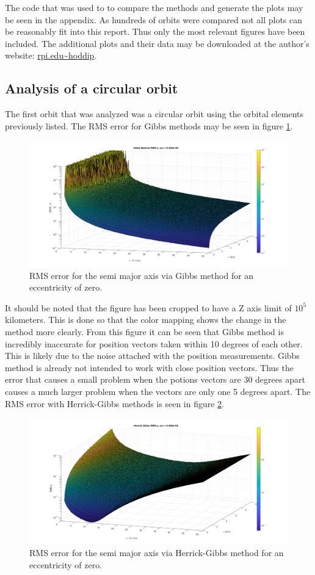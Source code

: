 \documentclass[12pt]{article}
\begin{document}
	The code that was used to to compare the methods and generate the plots may be seen in the appendix. As hundreds of orbits were compared not all plots can be reasonably fit into this report. Thus only the most relevant figures have been included. The additional plots and their data may be downloaded at the author's website: \url{rpi.edu\~hoddip}.
	\subsection{Analysis of a circular orbit}
	The first orbit that was analyzed was a circular orbit using the orbital elements previously listed. The RMS error for Gibbs methods may be seen in figure \ref{fig:circulargibbs}.
	\begin{figure}
		\centering
		\includegraphics[width=0.7\linewidth]{circularGibbs}
		\caption{RMS error for the semi major axis via Gibbs method for an eccentricity of zero.}
		\label{fig:circulargibbs}
	\end{figure}
		It should be noted that the figure has been cropped to have a Z axis limit of $10^5$ kilometers. This is done so that the color mapping shows the change in the method more clearly. From this figure it can be seen that Gibbs method is incredibly inaccurate for position vectors taken within 10 degrees of each other. This is likely due to the noise attached with the position measurements. Gibbs method is already not intended to work with close position vectors. Thus the error that causes a small problem when the potions vectors are 30 degrees apart causes a much larger problem when the vectors are only one 5 degrees apart. The RMS error with Herrick-Gibbs methods is seen in figure \ref{fig:circularherrickgibbs}.
		
	\begin{figure}[H]
		\centering
		\includegraphics[width=0.7\linewidth]{circularHerrickGibbs}
		\caption{RMS error for the semi major axis via Herrick-Gibbs method for an eccentricity of zero.}
		\label{fig:circularherrickgibbs}
	\end{figure}
	
\end{document}
